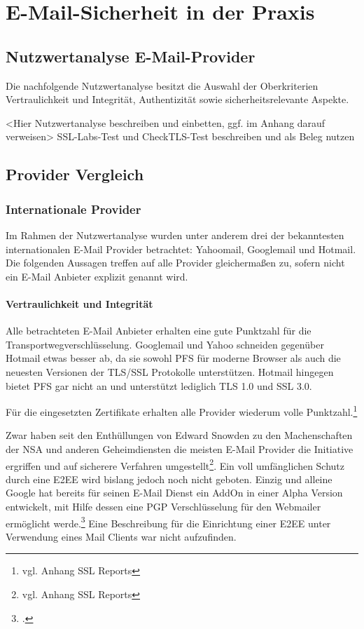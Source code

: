 \documentclass  [paper=a4,
				fontsize=12pt,
				listof=totoc,
				bibliography=totoc
				]{scrreprt}
\begin{document}
	\chapter{E-Mail-Sicherheit in der Praxis}
		\section{Nutzwertanalyse E-Mail-Provider}
		\label{sec:nwa}
			Die nachfolgende Nutzwertanalyse besitzt die Auswahl der Oberkriterien Vertraulichkeit und Integrität, Authentizität sowie sicherheitsrelevante Aspekte.
			
			
			<Hier Nutzwertanalyse beschreiben und einbetten, ggf. im Anhang darauf verweisen>
			SSL-Labs-Test und CheckTLS-Test beschreiben und als Beleg nutzen
			
			
		\section{Provider Vergleich}
			\subsection{Internationale Provider}
			Im Rahmen der Nutzwertanalyse wurden unter anderem drei der bekanntesten internationalen E-Mail Provider betrachtet: Yahoomail, Googlemail und Hotmail. Die folgenden Aussagen treffen auf alle Provider gleichermaßen zu, sofern nicht ein E-Mail Anbieter explizit genannt wird.
			\medskip
			
			\subsubsection{Vertraulichkeit und Integrität}
			Alle betrachteten E-Mail Anbieter erhalten eine gute Punktzahl für die Transportwegverschlüsselung. Googlemail und Yahoo schneiden gegenüber Hotmail etwas besser ab, da sie sowohl \ac{PFS} für moderne Browser als auch die neuesten Versionen der \ac{TLS/SSL} Protokolle unterstützen. Hotmail hingegen bietet \ac{PFS} gar nicht an und unterstützt lediglich \ac{TLS} 1.0 und \ac{SSL} 3.0.
			
			Für die eingesetzten Zertifikate erhalten alle Provider wiederum volle Punktzahl.\footnote{vgl. Anhang SSL Reports}
			\medskip
			
			Zwar haben seit den Enthüllungen von Edward Snowden zu den Machenschaften der \ac{NSA} und anderen Geheimdiensten die meisten E-Mail Provider die Initiative ergriffen und  auf sicherere Verfahren umgestellt\footnote{vgl. Anhang SSL Reports}. Ein voll umfänglichen Schutz durch eine \ac{E2EE} wird bislang jedoch noch nicht geboten. Einzig und alleine Google hat bereits für seinen E-Mail Dienst ein AddOn in einer Alpha Version entwickelt, mit Hilfe dessen eine PGP Verschlüsselung für den Webmailer ermöglicht werde.\footcite[Vgl.][]{Kirsch} Eine Beschreibung für die Einrichtung einer \ac{E2EE} unter Verwendung eines Mail Clients war nicht aufzufinden.
			
\end{document}
